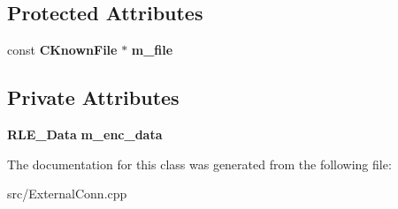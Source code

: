 \subsection*{Protected Attributes}
\begin{DoxyCompactItemize}
\item 
const {\bf CKnownFile} $\ast$ {\bfseries m\_\-file}\label{classCKnownFile__Encoder_afb519e0656ea47a529ed45981034087a}

\end{DoxyCompactItemize}
\subsection*{Private Attributes}
\begin{DoxyCompactItemize}
\item 
{\bf RLE\_\-Data} {\bfseries m\_\-enc\_\-data}\label{classCKnownFile__Encoder_a028f560d985a8e99c3a77d1d91ef5c3b}

\end{DoxyCompactItemize}


The documentation for this class was generated from the following file:\begin{DoxyCompactItemize}
\item 
src/ExternalConn.cpp\end{DoxyCompactItemize}
